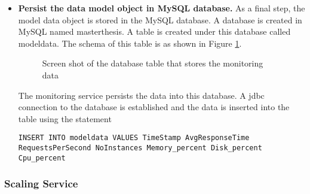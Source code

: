 \documentclass[article,type=msc,colorback,12pt,accentcolor=tud8b,table]{tudthesis}
\begin{document}
\begin{itemize}
\item{\textbf{Persist the data model object in MySQL database.}} As  a final step, the model data object is stored in the MySQL database. A database is created in MySQL named masterthesis. A table is created under this database called modeldata. The schema of this table is as shown in Figure \ref{fig:database_schema_screenshot}.

 \begin{figure}[h]
 	\begin{center}
 		\makebox[\textwidth]{\texttt{[image: D5]}}
 	\end{center}
 	\caption{Screen shot of the database table that stores the monitoring data}
 	\label{fig:database_schema_screenshot}
 \end{figure}	

The monitoring service persists the data into this database. A \gls{jdbc} connection to the database is established and the data is inserted into the table using the statement 
\begin{lstlisting}
INSERT INTO modeldata VALUES TimeStamp AvgResponseTime RequestsPerSecond NoInstances Memory_percent Disk_percent  Cpu_percent
\end{lstlisting}
		
\end{itemize}	
\subsubsection{Scaling Service}
	
\end{document}
